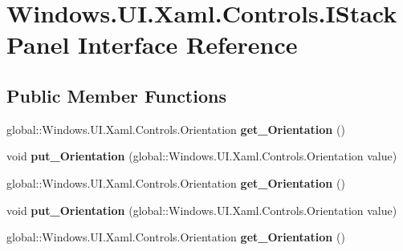 \hypertarget{interface_windows_1_1_u_i_1_1_xaml_1_1_controls_1_1_i_stack_panel}{}\section{Windows.\+U\+I.\+Xaml.\+Controls.\+I\+Stack\+Panel Interface Reference}
\label{interface_windows_1_1_u_i_1_1_xaml_1_1_controls_1_1_i_stack_panel}
\subsection*{Public Member Functions}
\begin{DoxyCompactItemize}
\item 
\mbox{\label{interface_windows_1_1_u_i_1_1_xaml_1_1_controls_1_1_i_stack_panel_aa54fbfc47c3011f5d19aca4449f62728}} 
global\+::\+Windows.\+U\+I.\+Xaml.\+Controls.\+Orientation {\bfseries get\+\_\+\+Orientation} ()
\item 
\mbox{\label{interface_windows_1_1_u_i_1_1_xaml_1_1_controls_1_1_i_stack_panel_aa44510136b6a8513057ad0c1c94f762a}} 
void {\bfseries put\+\_\+\+Orientation} (global\+::\+Windows.\+U\+I.\+Xaml.\+Controls.\+Orientation value)
\item 
\mbox{\label{interface_windows_1_1_u_i_1_1_xaml_1_1_controls_1_1_i_stack_panel_aa54fbfc47c3011f5d19aca4449f62728}} 
global\+::\+Windows.\+U\+I.\+Xaml.\+Controls.\+Orientation {\bfseries get\+\_\+\+Orientation} ()
\item 
\mbox{\label{interface_windows_1_1_u_i_1_1_xaml_1_1_controls_1_1_i_stack_panel_aa44510136b6a8513057ad0c1c94f762a}} 
void {\bfseries put\+\_\+\+Orientation} (global\+::\+Windows.\+U\+I.\+Xaml.\+Controls.\+Orientation value)
\item 
\mbox{\label{interface_windows_1_1_u_i_1_1_xaml_1_1_controls_1_1_i_stack_panel_aa54fbfc47c3011f5d19aca4449f62728}} 
global\+::\+Windows.\+U\+I.\+Xaml.\+Controls.\+Orientation {\bfseries get\+\_\+\+Orientation} ()

\end{DoxyCompactItemize}
